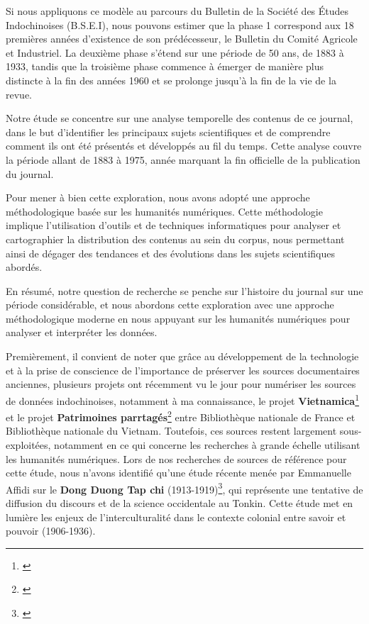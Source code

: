 Si nous appliquons ce modèle au parcours du Bulletin de la Société des Études Indochinoises (B.S.E.I), nous pouvons estimer que la phase 1 correspond aux 18 premières années d'existence de son prédécesseur, le Bulletin du Comité Agricole et Industriel. La deuxième phase s'étend sur une période de 50 ans, de 1883 à 1933, tandis que la troisième phase commence à émerger de manière plus distincte à la fin des années 1960 et se prolonge jusqu'à la fin de la vie de la revue.

Notre étude se concentre sur une analyse temporelle des contenus de ce journal, dans le but d'identifier les principaux sujets scientifiques et de comprendre comment ils ont été présentés et développés au fil du temps. Cette analyse couvre la période allant de 1883 à 1975, année marquant la fin officielle de la publication du journal.

Pour mener à bien cette exploration, nous avons adopté une approche méthodologique basée sur les humanités numériques. Cette méthodologie implique l'utilisation d'outils et de techniques informatiques pour analyser et cartographier la distribution des contenus au sein du corpus, nous permettant ainsi de dégager des tendances et des évolutions dans les sujets scientifiques abordés.

En résumé, notre question de recherche se penche sur l'histoire du journal sur une période considérable, et nous abordons cette exploration avec une approche méthodologique moderne en nous appuyant sur les humanités numériques pour analyser et interpréter les données.

Premièrement, il convient de noter que grâce au développement de la technologie et à la prise de conscience de l'importance de préserver les sources documentaires anciennes, plusieurs projets ont récemment vu le jour pour numériser les sources de données indochinoises, notamment à ma connaissance, le projet \textbf{Vietnamica}\footnote{\cite{bibli}} et le projet \textbf{Patrimoines parrtagés}\footnote{\cite{partage}} entre Bibliothèque nationale de France et Bibliothèque nationale du Vietnam. Toutefois, ces sources restent largement sous-exploitées, notamment en ce qui concerne les recherches à grande échelle utilisant les humanités numériques. Lors de nos recherches de sources de référence pour cette étude, nous n'avons identifié qu'une étude récente menée par Emmanuelle Affidi sur le \textbf{Dong Duong Tap chi} (1913-1919)\footnote{\cite{duong}}, qui représente une tentative de diffusion du discours et de la science occidentale au Tonkin. Cette étude met en lumière les enjeux de l'interculturalité dans le contexte colonial entre savoir et pouvoir (1906-1936).

